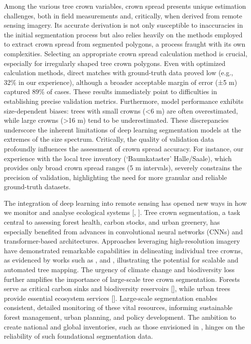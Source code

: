 \documentclass[runningheads]{llncs}
\begin{document}
Among the various tree crown variables, crown spread presents unique
estimation challenges, both in field measurements and, critically, when
derived from remote sensing imagery. Its accurate derivation is not only
susceptible to inaccuracies in the initial segmentation process but also
relies heavily on the methods employed to extract crown spread from
segmented polygons, a process fraught with its own complexities.
Selecting an appropriate crown spread calculation method is crucial,
especially for irregularly shaped tree crown polygons. Even with
optimized calculation methods, direct matches with ground-truth data
proved low (e.g., 32\% in our experience), although a broader acceptable
margin of error (±5 m) captured 89\% of cases. These results immediately
point to difficulties in establishing precise validation metrics.
Furthermore, model performance exhibits size-dependent biases: trees
with small crowns (\textless6 m) are often overestimated, while large
crowns (\textgreater16 m) tend to be underestimated. These discrepancies
underscore the inherent limitations of deep learning segmentation models
at the extremes of the size spectrum. Critically, the quality of
validation data profoundly influences the assessment of crown spread
accuracy. For instance, our experience with the local tree inventory
(`Baumkataster' Halle/Saale), which provides only broad crown spread
ranges (5 m intervals), severely constrains the precision of validation,
highlighting the need for more granular and reliable ground-truth
datasets.

The integration of deep learning into remote sensing has opened new ways
in how we monitor and analyse ecological systems
{[}\cite{zheng2024review}, \cite{zhao2023systematic}{]}. Tree crown
segmentation, a task central to assessing forest health, carbon stocks,
and urban greenery, has especially benefited from advances in
convolutional neural networks (CNNs) and transformer-based
architectures. Approaches leveraging high-resolution imagery have
demonstrated remarkable capabilities in delineating individual tree
crowns, as evidenced by works such as \cite{weinstein2019individual},
\cite{khant2025} and \cite{freudenberg2022individual}, illustrating the
potential for scalable and automated tree mapping. The urgency of
climate change and biodiversity loss further amplifies the importance of
large-scale tree crown segmentation. Forests serve as critical carbon
sinks and biodiversity reservoirs {[}\cite{pan2024enduring}{]}, while
urban trees provide essential ecosystem services
{[}\cite{sharma2024urban}{]}. Large-scale segmentation enables
consistent, detailed monitoring of these vital resources, informing
sustainable forest management, urban planning, and policy development.
The ambition to create national and global inventories, such as those
envisioned in \cite{tolan2024very}, hinges on the reliability of such
foundational segmentation data.
\end{document}
